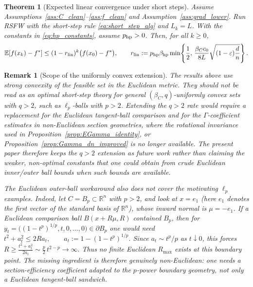 \documentclass{article}
\newtheorem{theorem}{Theorem}
\newtheorem{remark}{Remark}
\begin{document}
\begin{theorem}[Expected linear convergence under short steps]
\label{thm:linear_convergence}
Assume Assumptions~\ref{ass:C_clean}--\ref{ass:f_clean} and
Assumption~\ref{ass:grad_lower}. Run RSFW with the short-step rule
\eqref{eq:short_step_alg} and \(L_k=L\). With the constants in
\eqref{eq:hp_constants}, assume \(p_{\rm hp}>0\). Then, for all \(k\ge0\),
\begin{equation}
\mathbb E[f(x_k)-f^*]
\le
(1-r_{\rm lin})^k\bigl(f(x_0)-f^*\bigr),
\qquad
r_{\rm lin}
:=
p_{\rm hp}\beta_{\rm hp}
\min\!\left\{
\frac12,\,
\frac{\beta_C c_0}{8L}
\sqrt{(1-\varepsilon)\frac dn}
\right\}.
\label{eq:linear_rate}
\end{equation}
\end{theorem}
\begin{remark}[Scope of the uniformly convex extension]
\label{rem:q_uniform_scope}
The results above use strong convexity of the feasible set in the Euclidean metric.
They should not be read as an optimal short-step theory for general
\((\beta_C,q)\)-uniformly convex sets with \(q>2\), such as \(\ell_p\)-balls
with \(p>2\). Extending the \(q>2\) rate would require a replacement for the
Euclidean tangent-ball comparison and for the \(\Gamma\)-coefficient estimates in
non-Euclidean section geometries, where the rotational invariance used in
Proposition~\ref{prop:EGamma_identity}, or Proposition~\ref{prop:Gamma_dn_improved} is no longer available. The present
paper therefore keeps the \(q>2\) extension as future work rather than claiming
the weaker, non-optimal constants that one could obtain from crude Euclidean
inner/outer ball bounds when such bounds are available.

The Euclidean outer-ball workaround also does not cover the motivating
\(\ell_p\) examples. Indeed, let \(C=B_p\subset\mathbb R^n\) with \(p>2\), and 
look at \(x=e_1\) (here $e_1$ denotes the first vector of the standard basis of $\mathbb{R}^n$), whose inward normal is \(\mu=-e_1\). If a Euclidean
comparison ball \(B(x+R\mu,R)\) contained \(B_p\), then for
$
y_t=\bigl((1-t^p)^{1/p},t,0,\ldots,0\bigr)\in\partial B_p
$
one would need
$
t^2+a_t^2\le 2Ra_t,
\qquad
a_t:=1-(1-t^p)^{1/p}.
$
Since \(a_t\sim t^p/p\) as \(t\downarrow0\), this forces
$
R\ge \frac{t^2+a_t^2}{2a_t}
\sim \frac p2\,t^{2-p}\to\infty.
$
Thus no finite Euclidean \(R_{\max}\) exists at this boundary point. The
missing ingredient is therefore genuinely non-Euclidean: one needs a
section-efficiency coefficient adapted to the \(p\)-power boundary geometry,
not only a Euclidean tangent-ball sandwich.
\end{remark}
\end{document}
